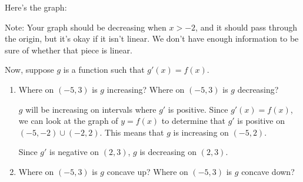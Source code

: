 \documentclass{article}
\begin{document}
\begin{enumerate}
\begin{enumerate}
    \begin{solution}
      Here's the graph:
      \begin{center} 
      \end{center}       

      Note: Your graph should be decreasing when $x > -2$, and it should pass through the origin, but it's okay if it isn't linear. We don't have enough information to be sure of whether that piece is linear.
    \end{solution}

  \end{enumerate}

  Now, suppose $g$ is a function such that $g'(x) = f(x)$.

  \begin{enumerate}[resume]
  \item


    \begin{problem}[\stretch{0.3}]
      Where on $(-5, 3)$ is $g$ increasing? Where on $(-5, 3)$ is $g$ decreasing?
    \end{problem}

    \begin{solution}
      $g$ will be increasing on intervals where $g'$ is positive. 
      Since $g'(x)=f(x)$, we can look at the graph of $y=f(x)$ to determine
      that $g'$ is positive on $(-5, -2) \cup (-2, 2)$. This means that $g$ is
      increasing on $(-5, 2)$.

      Since $g'$ is negative on $(2, 3)$, $g$ is decreasing on $(2, 3)$. 
      
    \end{solution}

  \item
    \begin{problem}[\stretch{0.3}]
      Where on $(-5, 3)$ is $g$ concave up? Where on $(-5, 3)$ is $g$ concave down? 
    \end{problem}


\end{enumerate}
\end{enumerate}
\end{document}
